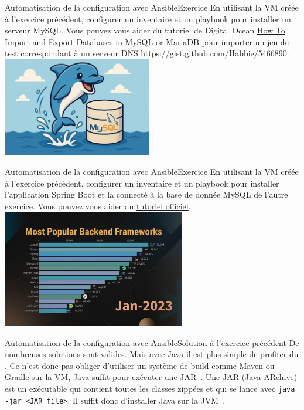 \documentclass{beamer}
\begin{document}
    \begin{frame}{Automatisation de la configuration avec Ansible}{Exercice \execcounterdispinc{}}
        En utilisant la VM créée à l'exercice précédent, configurer un inventaire et un playbook pour installer un serveur MySQL.
        \bigbreak
        Vous pouvez vous aider du tutoriel de Digital Ocean \href{https://www.digitalocean.com/community/tutorials/how-to-import-and-export-databases-in-mysql-or-mariadb}{How To Import and Export Databases in MySQL or MariaDB} pour importer un jeu de test correspondant à un serveur DNS \url{https://gist.github.com/Habbie/5466890}.
        \bigbreak
        \centering
        \includegraphics[width=6.5cm]{image/happy-dolphin}
    \end{frame}

    \begin{frame}{Automatisation de la configuration avec Ansible}{Exercice \execcounterdispinc{}}
        En utilisant la VM créée à l'exercice précédent, configurer un inventaire et un playbook pour installer l'application Spring Boot et la connecté à la base de donnée MySQL de l'autre exercice.
        \bigbreak
        Vous pouvez vous aider du \href{https://spring.io/guides/gs/spring-boot}{tutoriel officiel}.
        \bigbreak
        \centering
        \includegraphics[width=8cm]{image/most-popular-backend}
    \end{frame}

    \begin{frame}{Automatisation de la configuration avec Ansible}{Solution à l'exercice précédent}
        De nombreuses solutions sont valides.
        Mais avec Java il est plus simple de profiter du .
        \bigbreak
        Ce n'est donc pas obliger d'utiliser un système de build comme Maven ou Gradle sur la VM, Java suffit pour exécuter une JAR~.
        \bigbreak
        Une JAR (Java ARchive) est un exécutable qui contient toutes les classes zippées et qui se lance avec \lstinline{java -jar <JAR file>}.
        Il suffit donc d'installer Java sur la JVM~.
    \end{frame}
\end{document}

